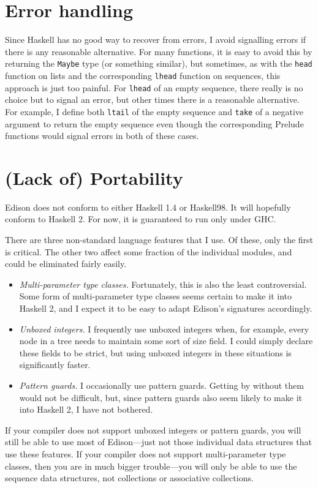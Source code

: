 \documentclass{report}
\newcommand{\cd}{\texttt}
\begin{document}
\section{Error handling}

Since Haskell has no good way to recover from errors, I avoid
signalling errors if there is any reasonable alternative.  For many
functions, it is easy to avoid this by returning the \cd{Maybe} type (or
something similar), but sometimes, as with the \cd{head} function on lists
and the corresponding \cd{lhead} function on sequences, this approach is
just too painful.  For \cd{lhead} of an empty sequence, there really is no
choice but to signal an error, but other times there is a reasonable
alternative.  For example, I define both \cd{ltail} of the empty sequence
and \cd{take} of a negative argument to return the empty sequence even
though the corresponding Prelude functions would signal errors in both
of these cases.

\section{(Lack of) Portability} \label{portability}

Edison does not conform to either Haskell 1.4 or Haskell98.
It will hopefully conform to Haskell 2.  For now, it is guaranteed to
run only under GHC.

There are three non-standard language features that I use.  Of these,
only the first is critical.  The other two affect some fraction of the
individual modules, and could be eliminated fairly easily.
\begin{itemize}
\item \emph{Multi-parameter type classes.} Fortunately, this is also
  the least controversial.  Some form of multi-parameter type classes
  seems certain to make it into Haskell 2, and I expect it to be easy
  to adapt Edison's signatures accordingly.
\item \emph{Unboxed integers.} I frequently use unboxed integers when,
  for example, every node in a tree needs to maintain some sort of size
  field.  I could simply declare these fields to be strict, but
  using unboxed integers in these situations is significantly faster.
\item \emph{Pattern guards.} I occasionally use pattern guards.
  Getting by without them would not be difficult, but, since pattern guards 
  also seem likely to make it into Haskell 2, I have not bothered.
\end{itemize}
If your compiler does not support unboxed integers or pattern guards, you 
will still be able to use most of Edison---just not those 
individual data structures that use these features.
If your compiler does not support multi-parameter type classes, then
you are in much bigger trouble---you will only be able to use the
sequence data structures, not collections or associative collections.
\end{document}
